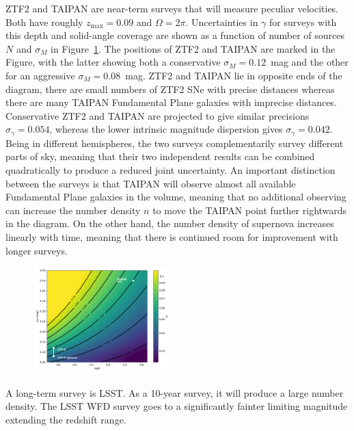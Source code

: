 \documentclass[11pt, oneside]{article}   	%
\begin{document}
ZTF2 and TAIPAN are near-term surveys that will measure peculiar velocities.  Both have roughly
 $z_{\text{max}}=0.09$ and $\Omega = 2\pi$.
Uncertainties in $\gamma$ for surveys with this depth and solid-angle coverage 
are shown as a function of number of sources $N$ and $\sigma_M$ in Figure~\ref{surface:fig}. The positions of ZTF2 and TAIPAN are marked
in the Figure, with the latter showing both  a conservative $\sigma_M=0.12$~mag and the other for an aggressive $\sigma_M=0.08$~mag.
ZTF2 and TAIPAN lie in opposite ends of the diagram, there are small numbers of ZTF2 SNe with precise distances
whereas there are many TAIPAN Fundamental Plane galaxies with imprecise distances. 
Conservative ZTF2 and TAIPAN
are projected to give similar precisions $\sigma_ \gamma = 0.054$, whereas  the lower intrinsic magnitude dispersion  gives
$\sigma_ \gamma = 0.042$.  Being in different hemispheres, the two surveys
complementarily survey different parts of sky, meaning that their two independent results can be
combined  quadratically to produce a reduced joint uncertainty.  An important distinction between the surveys is
that TAIPAN will observe almost all available Fundamental Plane galaxies in the volume, meaning that no additional observing can
increase the number density $n$ to
move the TAIPAN point further rightwards in the diagram.  On the other hand, the number density of supernova increases
linearly with time, meaning that there is continued room for improvement with longer surveys.

\begin{figure}
\centering
\includegraphics[width=0.49\textwidth]{src/surface1.pdf}
\caption{
\label{surface:fig}}
\end{figure}

A long-term survey is LSST.  As a 10-year survey, it will produce a large number density.  The LSST WFD survey goes to a significantly
fainter limiting magnitude extending the redshift range.
\end{document}
